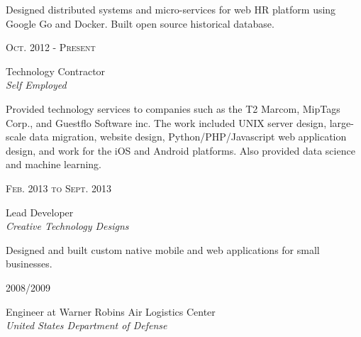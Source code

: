 \documentclass[10pt]{article} %
\begin{document}
{\begin{minipage}[t]{0.5\textwidth}
\small{Designed distributed systems and micro-services for web HR platform using Google Go and Docker.  Built open source historical database.}\\


{\raggedleft\textsc{Oct. 2012 - Present}\par}

{\raggedright\large Technology Contractor\\
\textit{Self Employed}\\[5pt]}

\small{Provided technology services to companies such as the T2 Marcom, MipTags Corp., and Guestflo Software inc. The work included UNIX server design, large-scale data migration, website design, Python/PHP/Javascript web application design, and work for the iOS and Android platforms.  Also provided data science and machine learning.}\\


{\raggedleft\textsc{Feb. 2013 to Sept. 2013}\par}

{\raggedright\large Lead Developer\\
\textit{Creative Technology Designs}\\[5pt]}


\small{Designed and built custom native mobile and web applications for small businesses.}\\


{\raggedleft\textsc{2008/2009}\par}

{\raggedright\large Engineer at Warner Robins Air Logistics Center\\
\textit{United States Department of Defense}\\[5pt]}


\end{minipage}}
\end{document}
